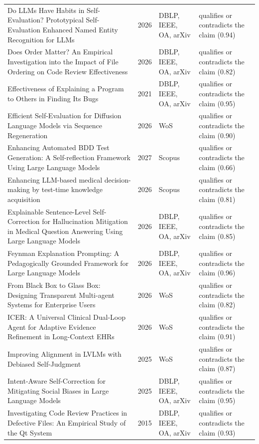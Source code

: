 \begin{longtable}{@{}%
  >{\raggedright\arraybackslash}p{}c%
  >{\raggedright\arraybackslash}p{}%
  >{\raggedright\arraybackslash}p{}@{}}
Do LLMs Have Habits in Self-Evaluation? Prototypical Self-Evaluation Enhanced Named Entity Recognition for LLMs & 2026 & DBLP, IEEE, OA, arXiv & qualifies or contradicts the claim (0.94) \\
Does Order Matter? An Empirical Investigation into the Impact of File Ordering on Code Review Effectiveness & 2026 & DBLP, IEEE, OA, arXiv & qualifies or contradicts the claim (0.82) \\
Effectiveness of Explaining a Program to Others in Finding Its Bugs & 2021 & DBLP, IEEE, OA, arXiv & qualifies or contradicts the claim (0.95) \\
Efficient Self-Evaluation for Diffusion Language Models via Sequence Regeneration & 2026 & WoS & qualifies or contradicts the claim (0.90) \\
Enhancing Automated BDD Test Generation: A Self-reflection Framework Using Large Language Models & 2027 & Scopus & qualifies or contradicts the claim (0.66) \\
Enhancing LLM-based medical decision-making by test-time knowledge acquisition & 2026 & Scopus & qualifies or contradicts the claim (0.81) \\
Explainable Sentence-Level Self-Correction for Hallucination Mitigation in Medical Question Answering Using Large Language Models & 2026 & DBLP, IEEE, OA, arXiv & qualifies or contradicts the claim (0.85) \\
Feynman Explanation Prompting: A Pedagogically Grounded Framework for Large Language Models & 2026 & DBLP, IEEE, OA, arXiv & qualifies or contradicts the claim (0.96) \\
From Black Box to Glass Box: Designing Transparent Multi-agent Systems for Enterprise Users & 2026 & WoS & qualifies or contradicts the claim (0.82) \\
ICER: A Universal Clinical Dual-Loop Agent for Adaptive Evidence Refinement in Long-Context EHRs & 2026 & WoS & qualifies or contradicts the claim (0.91) \\
Improving Alignment in LVLMs with Debiased Self-Judgment & 2025 & WoS & qualifies or contradicts the claim (0.87) \\
Intent-Aware Self-Correction for Mitigating Social Biases in Large Language Models & 2025 & DBLP, IEEE, OA, arXiv & qualifies or contradicts the claim (0.95) \\
Investigating Code Review Practices in Defective Files: An Empirical Study of the Qt System & 2015 & DBLP, IEEE, OA, arXiv & qualifies or contradicts the claim (0.93) \\

\end{longtable}
